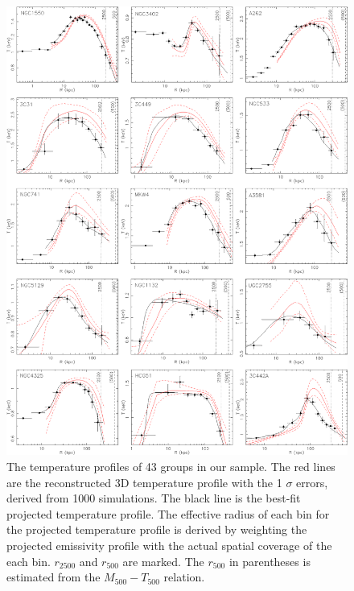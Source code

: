 \documentclass{aastex}
\begin{document}
\begin{figure}
\centerline{\includegraphics[height=1.25\linewidth]{f3.eps}}
  \caption{The temperature profiles of 43 groups in our sample. The red lines
are the reconstructed 3D temperature profile with the 1 $\sigma$ errors,
derived from 1000 simulations. The black line is the best-fit projected
temperature profile. The effective radius of each bin for the projected temperature
profile is derived by weighting the projected emissivity profile with the actual
spatial coverage of the each bin. $r_{2500}$ and $r_{500}$ are marked. The $r_{500}$
in parentheses is estimated from the $M_{500} - T_{500}$ relation.
}
\end{figure}
\clearpage
\end{document}
